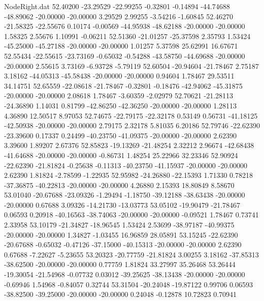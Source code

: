 \begin{filecontents}{NodeRight.dat}
  52.40200  -23.29529  -22.99255    -0.32801   -0.14894  -44.74688  -48.89062  -20.00000  -20.00000    3.29529    2.99255   -3.54216   -1.60845
  52.46270  -21.58325  -22.55676     0.10174   -0.00569  -44.95938  -48.62188  -20.00000  -20.00000    1.58325    2.55676    1.10991   -0.06211
  52.51360  -21.01257  -25.37598     2.35793    1.53424  -45.25000  -45.27188  -20.00000  -20.00000    1.01257    5.37598   25.62991   16.67671
  52.55434  -22.55615  -23.73169    -0.65032   -0.54288  -43.58750  -44.69688  -20.00000  -20.00000    2.55615    3.73169   -6.93728   -5.79119
  52.60504  -20.94604  -21.78467     2.75187    3.18162  -44.05313  -45.58438  -20.00000  -20.00000    0.94604    1.78467   29.53511   34.14751
  52.65559  -22.08618  -21.78467    -0.32801   -0.18476  -42.94062  -45.31875  -20.00000  -20.00000    2.08618    1.78467   -3.60359   -2.02979
  52.70621  -21.28113  -24.36890     1.14031    0.81799  -42.86250  -42.36250  -20.00000  -20.00000    1.28113    4.36890   12.50517    8.97053
  52.74675  -22.79175  -22.32178     0.53149    0.56731  -41.18125  -42.50938  -20.00000  -20.00000    2.79175    2.32178    5.81035    6.20186
  52.79746  -22.62390  -23.39600     0.17337    0.24499  -40.23750  -41.09375  -20.00000  -20.00000    2.62390    3.39600    1.89207    2.67376
  52.85823  -19.13269  -21.48254     2.32212    2.96674  -42.68438  -41.64688  -20.00000  -20.00000   -0.86731    1.48254   25.22966   32.23346
  52.90924  -22.62390  -21.81824    -0.25638   -0.11313  -40.23750  -41.15937  -20.00000  -20.00000    2.62390    1.81824   -2.78599   -1.22935
  52.95982  -24.26880  -22.15393     1.71330    0.78218  -37.36875  -40.22813  -20.00000  -20.00000    4.26880    2.15393   18.80849    8.58670
  53.01040  -20.67688  -23.09326    -1.29494   -1.18750  -39.12188  -38.63438  -20.00000  -20.00000    0.67688    3.09326  -14.21730  -13.03773
  53.05102  -19.90479  -21.78467     0.06593    0.20918  -40.16563  -38.74063  -20.00000  -20.00000   -0.09521    1.78467    0.73741    2.33958
  53.10179  -21.34827  -18.96545     1.53424    2.53699  -38.97187  -40.99375  -20.00000  -20.00000    1.34827   -1.03455   16.96859   28.05891
  53.15245  -22.62390  -20.67688    -0.65032   -0.47126  -37.15000  -40.15313  -20.00000  -20.00000    2.62390    0.67688   -7.22627   -5.23655
  53.20323  -20.77759  -21.81824     3.00255    3.18162  -37.85313  -38.62500  -20.00000  -20.00000    0.77759    1.81824   33.27997   35.26468
  53.26444  -19.30054  -21.54968    -0.07732    0.03012  -39.25625  -38.13438  -20.00000  -20.00000   -0.69946    1.54968   -0.84057    0.32744
  53.31504  -20.24048  -19.87122     0.99706    0.06593  -38.82500  -39.25000  -20.00000  -20.00000    0.24048   -0.12878   10.72823    0.70941

\end{filecontents}
